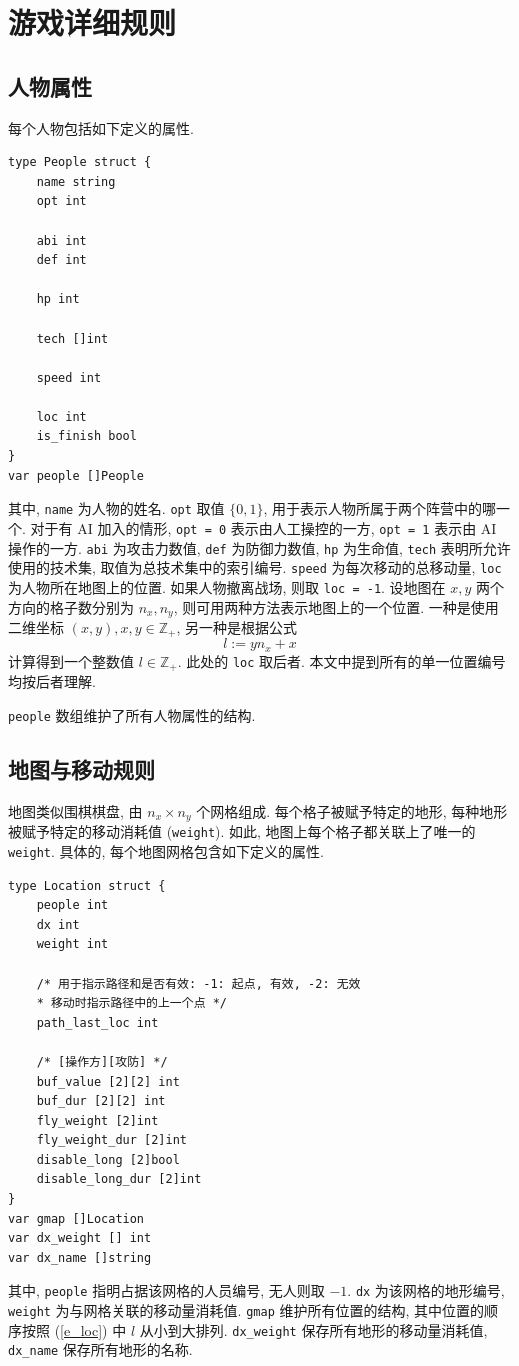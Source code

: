 \documentclass[UTF8, zihao=-4]{ctexart} %
\newcommand{\inte}{\mathbb{Z}} %
\newcommand{\lcode}{\lstinline} % 段内插入代码
\begin{document}
\section{游戏详细规则}
\subsection{人物属性}
每个人物包括如下定义的属性.
\begin{lstlisting}
type People struct {
	name string
	opt int

	abi int
	def int

	hp int

	tech []int

	speed int

	loc int
	is_finish bool
}
var people []People
\end{lstlisting}
其中, \lcode{name} 为人物的姓名. \lcode{opt} 取值 $\{0, 1\}$, 用于表示人物所属于两个阵营中的哪一个.
对于有 AI 加入的情形, \lcode{opt = 0} 表示由人工操控的一方, \lcode{opt = 1} 表示由 AI 操作的一方.
\lcode{abi} 为攻击力数值,  \lcode{def} 为防御力数值, \lcode{hp} 为生命值, 
\lcode{tech} 表明所允许使用的技术集, 取值为总技术集中的索引编号. 
\lcode{speed} 为每次移动的总移动量, \lcode{loc} 为人物所在地图上的位置. 如果人物撤离战场, 则取 \lcode{loc = -1}.
设地图在 $x, y$ 两个方向的格子数分别为 $n_x, n_y$, 则可用两种方法表示地图上的一个位置. 
一种是使用二维坐标 $(x, y), x, y \in \inte_+$, 另一种是根据公式
\begin{equation}
      \label{e_loc}
      l := yn_x + x
\end{equation}
计算得到一个整数值 $l \in \inte_+$. 此处的 \lcode{loc} 取后者. 本文中提到所有的单一位置编号均按后者理解.

\lcode{people} 数组维护了所有人物属性的结构.

\subsection{地图与移动规则}
地图类似围棋棋盘, 由 $n_x \times n_y$ 个网格组成. 每个格子被赋予特定的地形, 每种地形被赋予特定的移动消耗值 (\lcode{weight}).
如此, 地图上每个格子都关联上了唯一的 \lcode{weight}. 具体的, 每个地图网格包含如下定义的属性.
\begin{lstlisting}
type Location struct {
	people int
	dx int
	weight int

	/* 用于指示路径和是否有效: -1: 起点, 有效, -2: 无效 
	* 移动时指示路径中的上一个点 */
	path_last_loc int 

	/* [操作方][攻防] */
	buf_value [2][2] int
	buf_dur [2][2] int
	fly_weight [2]int
	fly_weight_dur [2]int
	disable_long [2]bool
	disable_long_dur [2]int
}
var gmap []Location 
var dx_weight [] int
var dx_name []string

\end{lstlisting}
其中, \lcode{people} 指明占据该网格的人员编号, 无人则取 $-1$. \lcode{dx} 为该网格的地形编号, 
\lcode{weight} 为与网格关联的移动量消耗值. \lcode{gmap} 维护所有位置的结构, 其中位置的顺序按照 (\ref{e_loc}) 中 $l$ 从小到大排列. 
\lcode{dx_weight} 保存所有地形的移动量消耗值, \lcode{dx_name} 保存所有地形的名称.
\end{document}
